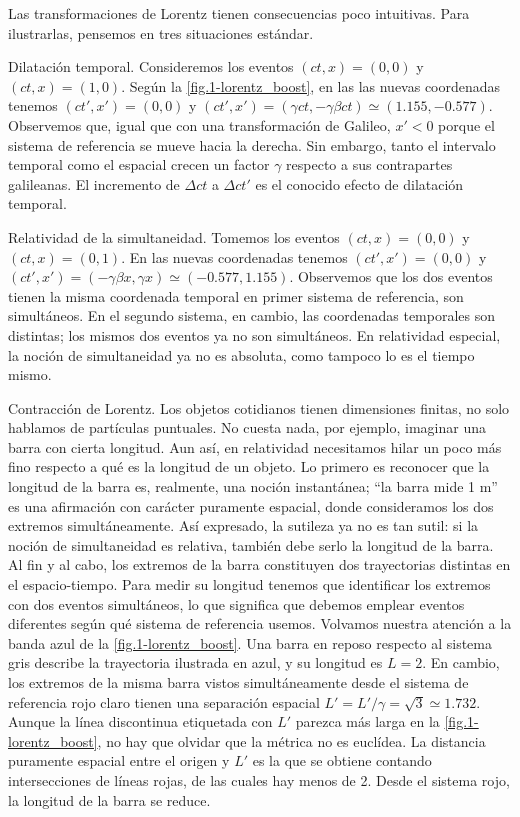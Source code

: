 Las transformaciones de Lorentz tienen consecuencias poco intuitivas. Para ilustrarlas, pensemos en tres situaciones estándar.
\begin{myitemize}
    \item Dilatación temporal. Consideremos los eventos \((ct, x) = (0,0)\) y \((ct, x) = (1, 0)\). Según la \cref{fig.1-lorentz_boost}, en las las nuevas coordenadas tenemos \((ct', x') = (0,0)\) y \((ct', x') = (\gamma ct, -\gamma\beta ct) \simeq (1.155, -0.577)\). Observemos que, igual que con una transformación de Galileo, \(x'<0\) porque el sistema de referencia se mueve hacia la derecha. Sin embargo, tanto el intervalo temporal como el espacial crecen un factor \(\gamma\) respecto a sus contrapartes galileanas. El incremento de \(\Delta ct\) a \(\Delta ct'\) es el conocido efecto de dilatación temporal. 
    \item Relatividad de la simultaneidad. Tomemos los eventos \((ct, x) = (0,0)\) y \((ct, x) = (0, 1)\). En las nuevas coordenadas tenemos \((ct', x') = (0,0)\) y \((ct', x') = (-\gamma\beta x, \gamma x) \simeq (-0.577, 1.155)\). Observemos que los dos eventos tienen la misma coordenada temporal en primer sistema de referencia, son simultáneos. En el segundo sistema, en cambio, las coordenadas temporales son distintas; los mismos dos eventos ya no son simultáneos. En relatividad especial, la noción de simultaneidad ya no es absoluta, como tampoco lo es el tiempo mismo.
    \item Contracción de Lorentz. Los objetos cotidianos tienen dimensiones finitas, no solo hablamos de partículas puntuales. No cuesta nada, por ejemplo, imaginar una barra con cierta longitud. Aun así, en relatividad necesitamos hilar un poco más fino respecto a qué es la longitud de un objeto. Lo primero es reconocer que la longitud de la barra es, realmente, una noción instantánea; ``la barra mide 1 m'' es una afirmación con carácter puramente espacial, donde consideramos los dos extremos simultáneamente. Así expresado, la sutileza ya no es tan sutil: si la noción de simultaneidad es relativa, también debe serlo la longitud de la barra. Al fin y al cabo, los extremos de la barra constituyen dos trayectorias distintas en el espacio-tiempo. Para medir su longitud tenemos que identificar los extremos con dos eventos simultáneos, lo que significa que debemos emplear eventos diferentes según qué sistema de referencia usemos. Volvamos nuestra atención a la banda azul de la \cref{fig.1-lorentz_boost}. Una barra en reposo respecto al sistema gris describe la trayectoria ilustrada en azul, y su longitud es \(L=2\). En cambio, los extremos de la misma barra vistos simultáneamente desde el sistema de referencia rojo claro tienen una separación espacial \(L'=L'/\gamma=\sqrt{3}\simeq 1.732\). Aunque la línea discontinua etiquetada con \(L'\) parezca más larga en la \cref{fig.1-lorentz_boost}, no hay que olvidar que la métrica no es euclídea. La distancia puramente espacial entre el origen y \(L'\) es la que se obtiene contando intersecciones de líneas rojas, de las cuales hay menos de 2. Desde el sistema rojo, la longitud de la barra se reduce.
\end{myitemize}

